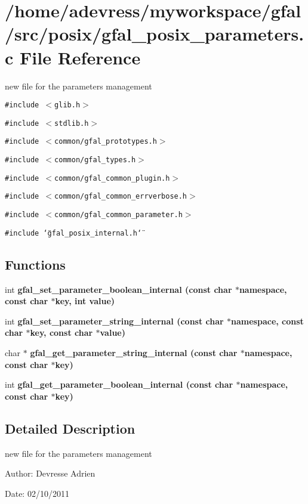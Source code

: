 \section{/home/adevress/myworkspace/gfal/src/posix/gfal\_\-posix\_\-parameters.c File Reference}
\label{gfal__posix__parameters_8c}
new file for the parameters management 

{\tt \#include $<$glib.h$>$}\par
{\tt \#include $<$stdlib.h$>$}\par
{\tt \#include $<$common/gfal\_\-prototypes.h$>$}\par
{\tt \#include $<$common/gfal\_\-types.h$>$}\par
{\tt \#include $<$common/gfal\_\-common\_\-plugin.h$>$}\par
{\tt \#include $<$common/gfal\_\-common\_\-errverbose.h$>$}\par
{\tt \#include $<$common/gfal\_\-common\_\-parameter.h$>$}\par
{\tt \#include \char`\"{}gfal\_\-posix\_\-internal.h\char`\"{}}\par
\subsection*{Functions}
\begin{CompactItemize}
\item 
int \bf{gfal\_\-set\_\-parameter\_\-boolean\_\-internal} (const char $\ast$namespace, const char $\ast$key, int value)
\item 
int \bf{gfal\_\-set\_\-parameter\_\-string\_\-internal} (const char $\ast$namespace, const char $\ast$key, const char $\ast$value)
\item 
char $\ast$ \bf{gfal\_\-get\_\-parameter\_\-string\_\-internal} (const char $\ast$namespace, const char $\ast$key)
\item 
int \bf{gfal\_\-get\_\-parameter\_\-boolean\_\-internal} (const char $\ast$namespace, const char $\ast$key)
\end{CompactItemize}


\subsection{Detailed Description}
new file for the parameters management 

\begin{Desc}
\item[Author:]Devresse Adrien \end{Desc}
\begin{Desc}
\item[Date:]02/10/2011 \end{Desc}



